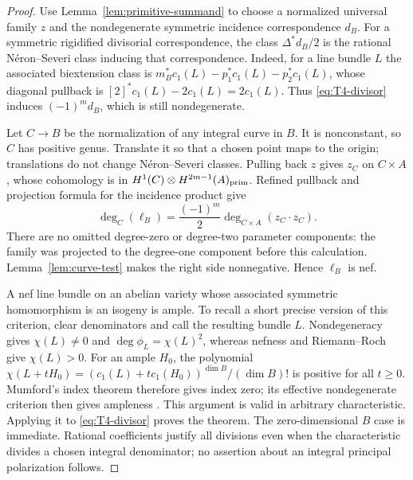 \documentclass[11pt,a4paper]{article}
\begin{document}
\begin{proof}
Use Lemma~\ref{lem:primitive-summand} to choose a normalized universal
family $z$ and the nondegenerate symmetric incidence correspondence
$d_B$. For a symmetric rigidified divisorial correspondence, the
class $\Delta^*d_B/2$ is the rational N\'eron--Severi class inducing
that correspondence. Indeed, for a line bundle $L$ the associated
biextension class is
$m_B^*c_1(L)-p_1^*c_1(L)-p_2^*c_1(L)$, whose diagonal pullback is
$[2]^*c_1(L)-2c_1(L)=2c_1(L)$.
Thus \eqref{eq:T4-divisor} induces $(-1)^md_B$, which is still
nondegenerate.

Let $C\to B$ be the normalization of any integral curve in $B$.
It is nonconstant, so $C$ has positive genus. Translate it so that a
chosen point maps to the origin; translations do not change
N\'eron--Severi classes. Pulling back $z$ gives $z_C$ on $C\times A$,
whose cohomology is in
$H^1(C)\otimes H^{2m-1}(A)_{\rm prim}$.
Refined pullback and projection formula for the incidence product give
\begin{equation}\label{eq:degree-test}
 \deg_C(\ell_B)=\frac{(-1)^m}{2}
       \deg_{C\times A}(z_C\cdot z_C).
\end{equation}
There are no omitted degree-zero or degree-two parameter components:
the family was projected to the degree-one component before this
calculation. Lemma~\ref{lem:curve-test} makes the right side
nonnegative. Hence $\ell_B$ is nef.

A nef line bundle on an abelian variety whose associated symmetric
homomorphism is an isogeny is ample. To recall a short precise version
of this criterion, clear denominators and call the resulting bundle
$L$. Nondegeneracy gives $\chi(L)\ne0$ and
$\deg\phi_L=\chi(L)^2$, whereas nefness and Riemann--Roch give
$\chi(L)>0$. For an ample $H_0$, the polynomial
$\chi(L+tH_0)=(c_1(L)+tc_1(H_0))^{\dim B}/(\dim B)!$
is positive for all $t\ge0$. Mumford's index theorem therefore gives
index zero; its effective nondegenerate criterion then gives
ampleness \cite[Chapter~III, \S16, Index Theorem, and Chapter~II,
\S6, Application~1]{MumfordAV}. This argument is valid in arbitrary
characteristic. Applying it to \eqref{eq:T4-divisor} proves the theorem.
The zero-dimensional $B$ case is immediate. Rational coefficients
justify all divisions even when the characteristic divides a chosen
integral denominator; no assertion about an integral principal
polarization follows.
\end{proof}
\end{document}
